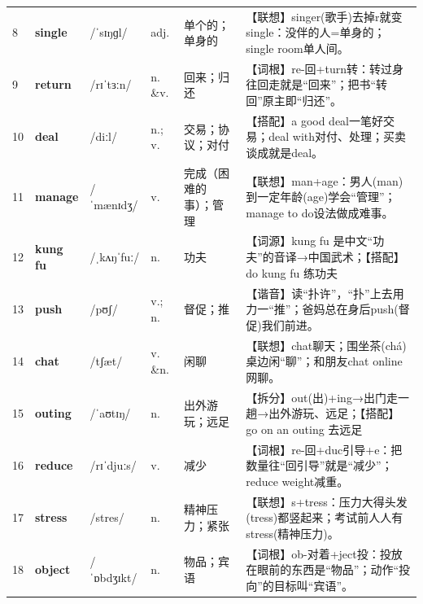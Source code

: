 \documentclass[UTF8,a4paper,11pt,oneside]{ctexbook}
\newcommand{\cellword}[1]{{\bfseries\textcolor{wordcol}{#1}}}
\newcommand{\cellipa}[1]{{\footnotesize\textcolor{ipacol}{#1}}}
\newcommand{\cellpos}[1]{\textcolor{poscol}{#1}}
\newcommand{\cellno}[1]{\textcolor{volcolor!75!black}{#1}}
\begin{document}
{\begin{longtable}{@{}C{0.045\textwidth}L{0.155\textwidth}L{0.175\textwidth}C{0.070\textwidth}L{0.180\textwidth}L{0.282\textwidth}@{}}
\cellno{8} & \cellword{single} & \cellipa{/ˈsɪŋɡl/} & \cellpos{adj.} & 单个的；单身的 & \textcolor{tagAssoc}{【联想】}singer(歌手)去掉r就变single：没伴的人=单身的；single room单人间。 \\
 \cellno{9} & \cellword{return} & \cellipa{/rɪˈtɜːn/} & \cellpos{n. \&v.} & 回来；归还 & \textcolor{tagRoot}{【词根】}re-回+turn转：转过身往回走就是“回来”；把书“转回”原主即“归还”。 \\
\cellno{10} & \cellword{deal} & \cellipa{/diːl/} & \cellpos{n.;\allowbreak{} v.} & 交易；协议；对付 & \textcolor{tagColloc}{【搭配】}a good deal一笔好交易；deal with对付、处理；买卖谈成就是deal。 \\
 \cellno{11} & \cellword{manage} & \cellipa{/ˈmænɪdʒ/} & \cellpos{v.} & 完成（困难的事）；管理 & \textcolor{tagAssoc}{【联想】}man+age：男人(man)到一定年龄(age)学会“管理”；manage to do设法做成难事。 \\
\cellno{12} & \cellword{kung fu} & \cellipa{/ˌkʌŋˈfuː/} & \cellpos{n.} & 功夫 & \textcolor{tagEtym}{【词源】}kung fu 是中文“功夫”的音译→\allowbreak{}中国武术；\textcolor{tagColloc}{【搭配】}do kung fu 练功夫 \\
 \cellno{13} & \cellword{push} & \cellipa{/pʊʃ/} & \cellpos{v.;\allowbreak{} n.} & 督促；推 & \textcolor{tagSound}{【谐音】}读“扑许”，“扑”上去用力一“推”；爸妈总在身后push(督促)我们前进。 \\
\cellno{14} & \cellword{chat} & \cellipa{/tʃæt/} & \cellpos{v. \&n.} & 闲聊 & \textcolor{tagAssoc}{【联想】}chat聊天；围坐茶(chá)桌边闲“聊”；和朋友chat online网聊。 \\
 \cellno{15} & \cellword{outing} & \cellipa{/ˈaʊtɪŋ/} & \cellpos{n.} & 出外游玩；远足 & \textcolor{tagSplit}{【拆分】}out(出)+ing→\allowbreak{}出门走一趟→\allowbreak{}出外游玩、远足；\textcolor{tagColloc}{【搭配】}go on an outing 去远足 \\
\cellno{16} & \cellword{reduce} & \cellipa{/rɪˈdjuːs/} & \cellpos{v.} & 减少 & \textcolor{tagRoot}{【词根】}re-回+duc引导+e：把数量往“回引导”就是“减少”；reduce weight减重。 \\
 \cellno{17} & \cellword{stress} & \cellipa{/stres/} & \cellpos{n.} & 精神压力；紧张 & \textcolor{tagAssoc}{【联想】}s+tress：压力大得头发(tress)都竖起来；考试前人人有stress(精神压力)。 \\
\cellno{18} & \cellword{object} & \cellipa{/ˈɒbdʒɪkt/} & \cellpos{n.} & 物品；宾语 & \textcolor{tagRoot}{【词根】}ob-对着+ject投：投放在眼前的东西是“物品”；动作“投向”的目标叫“宾语”。 \\

\end{longtable}}
\end{document}
